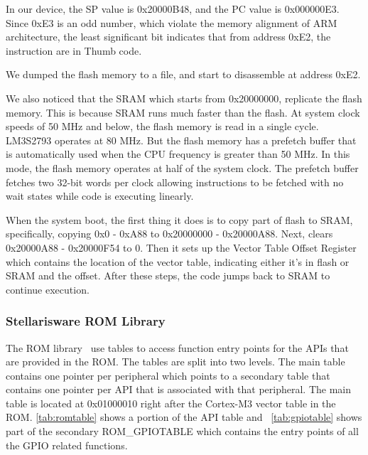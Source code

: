 In our device, the SP value is 0x20000B48, and the PC value is 0x000000E3. Since 0xE3 is an odd number, which violate the memory alignment of ARM architecture, the least significant bit indicates that from address 0xE2, the instruction are in Thumb code.

We dumped the flash memory to a file, and start to disassemble at address 0xE2.

We also noticed that the SRAM which starts from 0x20000000, replicate the flash memory. This is because SRAM runs much faster than the flash. At system clock speeds of 50 MHz and below, the flash memory is read in a single cycle. LM3S2793 operates at 80 MHz. But the flash memory has a prefetch buffer that is automatically used when the CPU frequency is greater than 50 MHz. In this mode, the flash memory operates at half of the system clock. The prefetch buffer fetches two 32-bit words per clock allowing instructions to be fetched with no wait states while code is executing linearly.

When the system boot, the first thing it does is to copy part of flash to SRAM, specifically, copying 0x0 - 0xA88 to 0x20000000 - 0x20000A88. Next, clears 0x20000A88 - 0x20000F54 to 0. Then it sets up the Vector Table Offset Register which contains the location of the vector table, indicating either it's in flash or SRAM and the offset. After these steps, the code jumps back to SRAM to continue execution.




\subsubsection{Stellarisware ROM Library}
The ROM library~\cite{lm3s2793rom} use tables to access function entry points for the APIs that are provided in the ROM. The tables are split into two levels. The main table contains one pointer per peripheral which points to a secondary table that contains one pointer per API that is associated with that peripheral. The main table is located at 0x01000010 right after the Cortex-M3 vector table in the ROM. \autoref{tab:romtable} shows a portion of the API table and ~\autoref{tab:gpiotable} shows part of the secondary ROM\_GPIOTABLE which contains the entry points of all the GPIO related functions.

